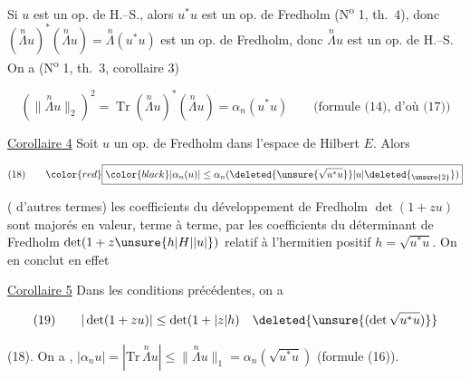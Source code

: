 
Si $u$ est un op. de H.--S., alors $u^*u$ est un op. de Fredholm (N\textsuperscript{o} 1, th.~4), donc $(\overset{n}{\Lambda}u)^*(\overset{n}{\Lambda}u)=\overset{n}{\Lambda}(u^*u)$ est un op. de Fredholm,  donc $\overset{n}{\Lambda}u$ est un op. de H.--S. On a (N\textsuperscript{o} 1, th.~3, corollaire 3)

\[
(\lVert\overset{n}{\Lambda}u\rVert_2)^2=\operatorname{Tr}(\overset{n}{\Lambda}u)^*(\overset{n}{\Lambda}u)=\alpha_n(u^*u)\qquad\text{(formule (14), d'où (17))}
\]
{\reversemarginpar{}}


\reversemarginpar
{}
\normalmarginpar
\uline{Corollaire 4} Soit $u$ un op. de Fredholm dans l'espace de Hilbert $E$. Alors

\[
\text{(18)}\qquad {\color{red}\boxed{\color{black}|\alpha_n(u)|\leq\alpha_n(\deleted{\unsure{\sqrt{u^*u}}}|u|\deleted{{}_{\unsure{2}}})}}
\]

( d'autres termes) les coefficients du développement de Fredholm $\det(1+zu)$ sont majorés en valeur, terme à terme, par les coefficients du déterminant de Fredholm $\det(1+z\unsure{h|H|\lvert u\rvert})$ relatif à l'hermitien positif $h=\sqrt{u^*u}$. On en conclut en effet

\uline{Corollaire 5} Dans les conditions précédentes, on a

\[
\text{(19)}\qquad |\det(1+zu)|\leq\det(1+|z|h)\quad\deleted{\unsure{(\det\sqrt{u^*u})}}
\]

 (18). On a , $|\alpha_nu|=|\mathrm{Tr}\,\overset{n}{\Lambda}u|\leq\|\overset{n}{\Lambda}u\|_1=\alpha_n(\sqrt{u^*u})$ (formule (16)).


